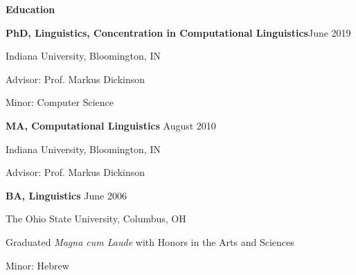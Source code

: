 \begin{singlespace}
\vspace{8pt}
\centerline{\textbf{Education}}
\begin{description}
\item \textbf{PhD, Linguistics, Concentration in Computational Linguistics}\hfill June 2019
\begin{description}
\item Indiana University, Bloomington, IN
\item Advisor: Prof. Markus Dickinson
\item Minor: Computer Science
\end{description}
\vspace{8pt}
\item \textbf{MA, Computational Linguistics} \hfill August 2010
\begin{description}
\item Indiana University, Bloomington, IN
\item Advisor: Prof. Markus Dickinson
\end{description}
\vspace{8pt}
\item \textbf{BA, Linguistics} \hfill June 2006
\begin{description}
\item The Ohio State University, Columbus, OH
\item Graduated \textit{Magna cum Laude} with Honors in the Arts and Sciences
\item Minor: Hebrew
\end{description}
\end{description}

\end{singlespace}
